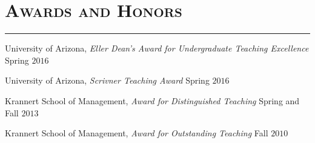 \documentclass[10pt,letterpaper]{article}
\renewenvironment{itemize}{
  \begin{list}{}{
    \setlength{\leftmargin}{1.5em}
    \setlength{\itemsep}{0.25em}
    \setlength{\parskip}{0pt}
    \setlength{\parsep}{0.25em}
  }
}{
  \end{list}
}
\begin{document}
\section*{\textsc{Awards and Honors}}
\nointerlineskip
\vspace{-3mm}
\rule{\textwidth}{0.5mm}

\begin{itemize}
\item University of Arizona, \emph{Eller Dean's Award for Undergraduate Teaching Excellence} \hfill Spring $2016$
\item University of Arizona, \emph{Scrivner Teaching Award} \hfill Spring $2016$
\item Krannert School of Management, \emph{Award for Distinguished Teaching} \hfill Spring and Fall $2013$
\item Krannert School of Management, \emph{Award for Outstanding Teaching} \hfill Fall $2010$
\end{itemize}
\end{document}
